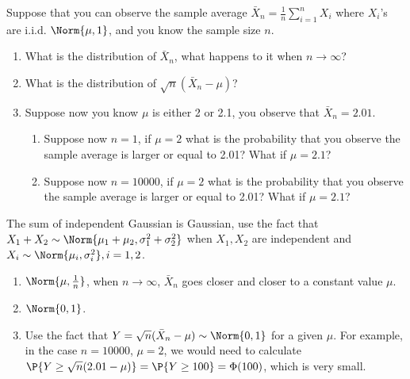 \begin{exercise}\label{eq:hypo test}
	Suppose that you can observe the sample average $\bar{X}_n=\frac{1}{n}\sum_{i=1}^n X_i$ where $X_i$'s are i.i.d. $\Norm{\mu,1}$,  and you know the sample size $n$.
	\begin{enumerate}
		\item What is the distribution of $\bar{X}_n$, what happens to it when $n\rightarrow \infty$?
		\item What is the distribution of $\sqrt{n}(\bar{X}_n-\mu)$?
		\item Suppose now you know $\mu$ is either 2 or 2.1, you observe that $\bar{X}_n=2.01$.
		\begin{enumerate}
			\item Suppose now $n=1$, if $\mu=2$ what is the probability that you observe the sample average is larger or equal to 2.01? What if $\mu=2.1$?
			\item Suppose now $n=10000$, if $\mu=2$ what is the probability that you observe the sample average is larger or equal to 2.01? What if $\mu=2.1$?  
		\end{enumerate}
	\end{enumerate}
	\begin{hint}
		The sum of independent Gaussian is Gaussian, use the fact that $X_1+X_2\sim \Norm{\mu_1+\mu_2, \sigma_1^2+\sigma_2^2}$ when $X_1,X_2$ are independent and $X_i\sim \Norm{\mu_i, \sigma_i^2}, i=1,2$. 
	\end{hint}
	\begin{solution}
		\begin{enumerate}
			\item $\Norm{\mu, \frac{1}{n}}$, when $n\rightarrow \infty$, $\bar{X}_n$ goes closer and closer to a constant value $\mu$.
			\item $\Norm{0,1}$.
			\item Use the fact that  $Y=\sqrt{n}(\bar{X}_n-\mu)\sim \Norm{0,1}$ for a given $\mu$. For example, in the case $n=10000$, $\mu=2$, we would need to calculate $\P{Y\geq \sqrt{n}(2.01-\mu)}=\P{Y\geq 100}=\Phi(100)$, which is very small.
		\end{enumerate}
	\end{solution}
\end{exercise}

